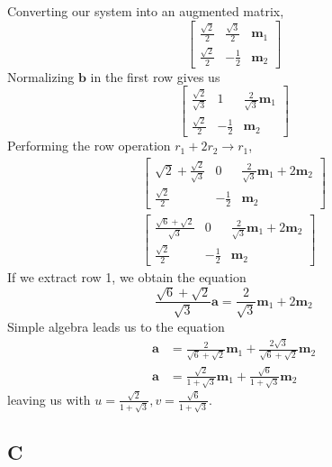 \documentclass[]{article}
\begin{document}
Converting our system into an augmented matrix,
\begin{equation}
	\left[
	\begin{array}{cc|c}
	\frac{\sqrt{2}}{2} & \frac{\sqrt{3}}{2} & \mathbf{m}_1 \\
	\frac{\sqrt{2}}{2} & -\frac{1}{2} & \mathbf{m}_2
	\end{array}
	\right]
\end{equation}
Normalizing \(\mathbf{b}\) in the first row gives us
\begin{equation}
	\left[
	\begin{array}{cc|c}
	\frac{\sqrt{2}}{\sqrt{3}} & 1 & \frac{2}{\sqrt{3}}\mathbf{m}_1 \\
	\frac{\sqrt{2}}{2} & -\frac{1}{2} & \mathbf{m}_2
	\end{array}
	\right]
\end{equation}
Performing the row operation \(r_1 + 2r_2 \to r_1\),
\begin{align}
	\left[
	\begin{array}{cc|c}
	\sqrt{2} + \frac{\sqrt{2}}{\sqrt{3}} & 0 & \frac{2}{\sqrt{3}}\mathbf{m}_1 + 2\mathbf{m}_2 \\
	\frac{\sqrt{2}}{2} & -\frac{1}{2} & \mathbf{m}_2
	\end{array}
	\right] \\
	\left[
	\begin{array}{cc|c}
	\frac{\sqrt{6} + \sqrt{2}}{\sqrt{3}} & 0 & \frac{2}{\sqrt{3}}\mathbf{m}_1 + 2\mathbf{m}_2 \\
	\frac{\sqrt{2}}{2} & -\frac{1}{2} & \mathbf{m}_2
	\end{array}
	\right]
\end{align}
If we extract row 1, we obtain the equation
\begin{equation}
	\frac{\sqrt{6} + \sqrt{2}}{\sqrt{3}} \mathbf{a} = \frac{2}{\sqrt{3}}\mathbf{m}_1 + 2\mathbf{m}_2
\end{equation}
Simple algebra leads us to the equation
\begin{align}
	\mathbf{a} &= \frac{2}{\sqrt{6} + \sqrt{2}}\mathbf{m}_1 + \frac{2\sqrt{3}}{\sqrt{6} + \sqrt{2}}\mathbf{m}_2 \\
	\mathbf{a} &= \frac{\sqrt{2}}{1 + \sqrt{3}}\mathbf{m}_1 + \frac{\sqrt{6}}{1 + \sqrt{3}}\mathbf{m}_2
\end{align}
leaving us with \(\boxed{u = \frac{\sqrt{2}}{1 + \sqrt{3}}, v = \frac{\sqrt{6}}{1 + \sqrt{3}}}\). 

\subsection{C}
\end{document}
